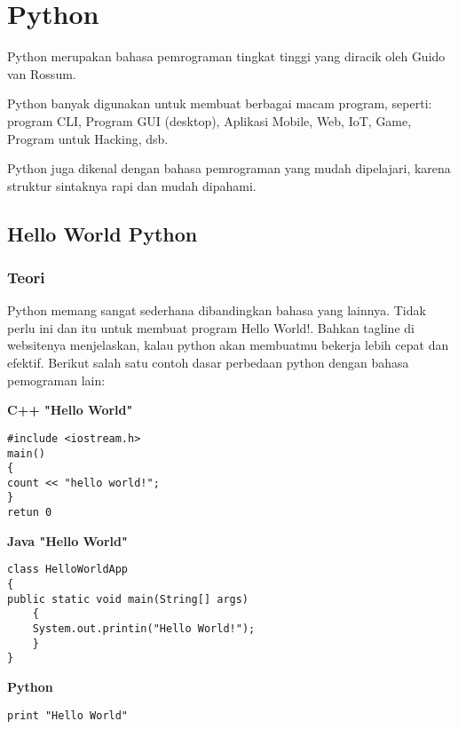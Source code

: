 \chapter{Python}
Python merupakan bahasa pemrograman tingkat tinggi yang diracik oleh Guido van Rossum.

Python banyak digunakan untuk membuat berbagai macam program, seperti: program CLI, Program GUI (desktop), Aplikasi Mobile, Web, IoT, Game, Program untuk Hacking, dsb.

Python juga dikenal dengan bahasa pemrograman yang mudah dipelajari, karena struktur sintaknya rapi dan mudah dipahami.
 \section{Hello World Python}
 \subsection{Teori}
 Python memang sangat sederhana dibandingkan bahasa yang lainnya. Tidak perlu ini dan itu untuk membuat program Hello World!.
Bahkan tagline di websitenya menjelaskan, kalau python akan membuatmu bekerja lebih cepat dan efektif.
Berikut salah satu contoh dasar perbedaan python dengan bahasa pemograman lain:
\par\textbf{C++ "Hello World"}
\begin{lstlisting}
#include <iostream.h>
main()
{
count << "hello world!";
}
retun 0
\end{lstlisting}
\par \textbf{Java "Hello World"}
\begin{lstlisting}
class HelloWorldApp
{
public static void main(String[] args)
    {
    System.out.printin("Hello World!");
    }
}
\end{lstlisting}
\par \textbf{Python}
\begin{lstlisting}
print "Hello World"
\end{lstlisting}

